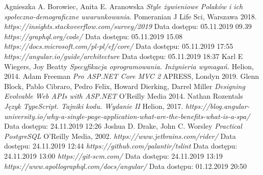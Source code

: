 \begin{thebibliography}{9}
      Agnieszka A. Borowiec, Anita E. Aranowska
      \emph{ Style żywieniowe Polaków i ich społeczno-demograficzne uwarunkowania}.
      Pomeranian J Life Sci, Warszawa
      2018.
     \emph{https://insights.stackoverflow.com/survey/2019 }
     Data dostępu: 05.11.2019 09.39
     \emph{https://graphql.org/code/}
     Data dostępu: 05.11.2019 15.08
     \emph{https://docs.microsoft.com/pl-pl/ef/core/}
     Data dostępu: 05.11.2019 17:55
     \emph{https://angular.io/guide/architecture}
     Data dostępu: 05.11.2019 18:37
     Karl E Wiegers, Joy Beatty
     \emph{Specyfikacja oprogramowania. Inżynieria wymagań.}
     Helion,
     2014.
     Adam Freeman
     \emph{Pro ASP.NET Core MVC 2}
     APRESS, Londyn
     2019.
     Glenn Block, Pablo Cibraro, Pedro Felix, Howard Dierking, Darrel Miller
     \emph{Designing Evolvable Web APIs with ASP.NET}
     O'Reilly Media
     2014.
     Nathan Rozentals
     \emph{Język TypeScript. Tajniki kodu. Wydanie II}
     Helion,
     2017.
     \emph{https://blog.angular-university.io/why-a-single-page-application-what-are-the-benefits-what-is-a-spa/} Data dostępu: 24.11.2019 12:26
     Joshua D. Drake, John C. Worsley
     \emph{Practical PostgreSQL}
     O'Reilly Media,
     2002.
     \emph{https://www.jetbrains.com/rider/}
     Data dostępu: 24.11.2019 12:44
     \emph{https://github.com/palantir/tslint}
     Data dostępu: 24.11.2019 13:00
     \emph{https://git-scm.com/}
     Data dostępu: 24.11.2019 13:19
     \emph{https://www.apollographql.com/docs/angular/}
     Data dostępu: 01.12.2019 20:50
   
\end{thebibliography}